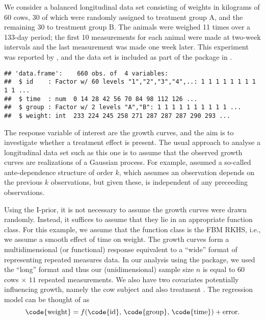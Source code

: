 %
%



We consider a balanced longitudinal data set consisting of weights in kilograms of 60 cows, 30 of which were randomly assigned to treatment group A, and the remaining 30 to treatment group B. The animals were weighed 11 times over a 133-day period; the first 10 measurements for each animal were made at two-week intervals and the last measurement was made one week later. This experiment was reported by \cite{kenward1987method}, and the data set is included as part of the package  in .

\begin{knitrout}
\color{fgcolor}\begin{kframe}
\begin{alltt}
  \hlstd{=} \hlstd{)}
\hlopt{$} \hlkwb{<-} \hlopt{$}  
\end{alltt}
\begin{verbatim}
## 'data.frame':	660 obs. of  4 variables:
##  $ id    : Factor w/ 60 levels "1","2","3","4",..: 1 1 1 1 1 1 1 1 1 1 ...
##  $ time  : num  0 14 28 42 56 70 84 98 112 126 ...
##  $ group : Factor w/ 2 levels "A","B": 1 1 1 1 1 1 1 1 1 1 ...
##  $ weight: int  233 224 245 258 271 287 287 287 290 293 ...
\end{verbatim}
\end{kframe}
\end{knitrout}

The response variable of interest are the  growth curves, and the aim is to investigate whether a treatment effect is present. The usual approach to analyse a longitudinal data set such as this one is to assume that the observed growth curves are realizations of a Gaussian process. For example, \cite{kenward1987method} assumed a so-called ante-dependence structure of order $k$, which assumes an observation depends on the previous $k$ observations, but given these, is independent of any preceeding observations.

Using the I-prior, it is not necessary to assume the growth curves were drawn randomly. Instead, it suffices to assume that they lie in an appropriate function class. For this example, we assume that the function class is the FBM RKHS, i.e., we assume a smooth effect of time on weight. The growth curves form a multidimensional (or functional) response equivalent to a ``wide'' format of representing repeated measures data. In our analysis using the  package, we used the ``long'' format and thus our (unidimensional) sample size $n$ is equal to $60$ cows $\times$ $11$ repeated measurements. We also have two covariates potentially influencing growth, namely the cow subject  and also treatment . The regression model can be thought of as
\[
  \text{\code{weight}} = f(\text{\code{id}}, \, \text{\code{group}}, \, \text{\code{time}}) + \text{error}.
\]


